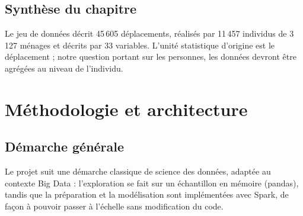 \documentclass[12pt,a4paper]{report}
\newcommand{\1}{\mathbf{1}}
\begin{document}
\section{Synthèse du chapitre}
Le jeu de données décrit 45\,605 déplacements, réalisés par 11\,457 individus de 3\,127 ménages et décrits par 33 variables. L'unité statistique d'origine est le déplacement ; notre question portant sur les personnes, les données devront être agrégées au niveau de l'individu.

\chapter{Méthodologie et architecture}\label{ch:methodo}

\section{Démarche générale}
Le projet suit une démarche classique de science des données, adaptée au contexte Big Data : l'exploration se fait sur un échantillon en mémoire (pandas), tandis que la préparation et la modélisation sont implémentées avec Spark, de façon à pouvoir passer à l'échelle sans modification du code.
\end{document}
